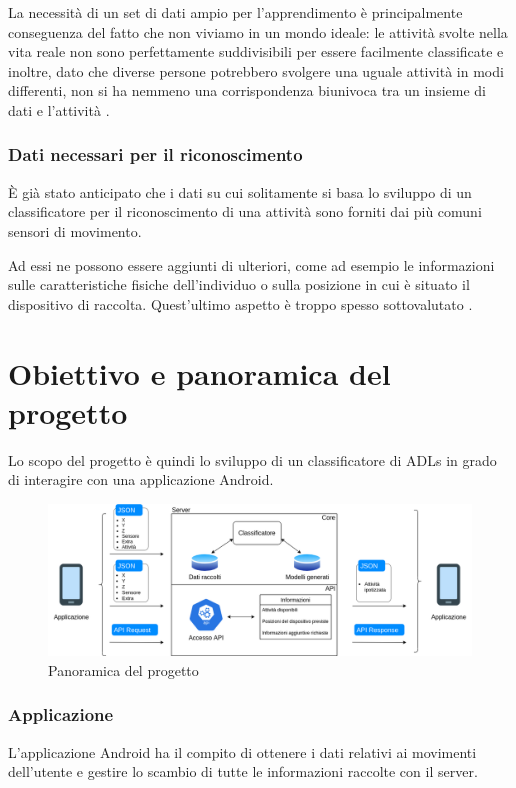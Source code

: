 La necessità di un set di dati ampio per l'apprendimento è principalmente conseguenza del fatto che non viviamo in un mondo ideale: 
le attività svolte nella vita reale non sono perfettamente suddivisibili per essere facilmente classificate e inoltre, dato che diverse persone
potrebbero svolgere una uguale attività in modi differenti, non si ha nemmeno una corrispondenza biunivoca tra un insieme di dati e l'attività \cite{framework_long_term_data_har}.

\subsubsection{Dati necessari per il riconoscimento}
È già stato anticipato che i dati su cui solitamente si basa lo sviluppo di un classificatore per il riconoscimento di una attività sono forniti dai 
più comuni sensori di movimento.

Ad essi ne possono essere aggiunti di ulteriori, come ad esempio le informazioni sulle caratteristiche fisiche
dell'individuo o sulla posizione in cui è situato il dispositivo di raccolta.
Quest'ultimo aspetto è troppo spesso sottovalutato \cite{umafall}.

\section{Obiettivo e panoramica del progetto}
Lo scopo del progetto è quindi lo sviluppo di un classificatore di ADLs in grado di interagire con una applicazione
Android.

\begin{figure}[H]
    \centering
    \includegraphics[scale = 0.41]{assets/images/overview.png}
    \caption{Panoramica del progetto}
    \label{fig:overview}
\end{figure}

\subsubsection{Applicazione}
L'applicazione Android ha il compito di ottenere i dati relativi ai movimenti dell'utente 
e gestire lo scambio di tutte le informazioni raccolte con il server.
